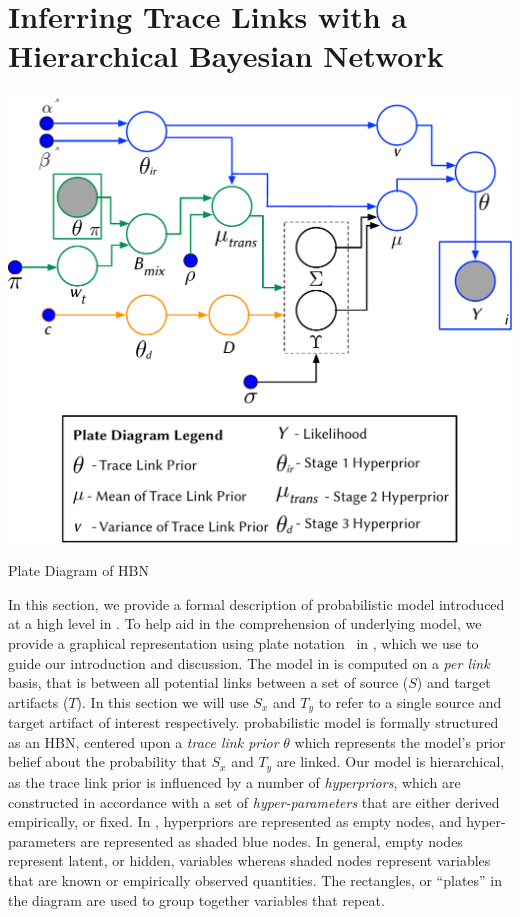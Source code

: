 \chapter{Inferring Trace Links with \hfill \break a Hierarchical Bayesian Network}
\label{ch:appI-approach-i}

\begin{marginfigure}%
\centering

\includegraphics[width=\columnwidth]{graphics/applicationsI-approach/fig1_Model-Plate-Diagram.pdf}

\caption{Plate Diagram of \Comets HBN}
\label{fig:model-approachI}
\end{marginfigure}

In this section, we provide a formal description of \Comets probabilistic model introduced at a high level in  . To help aid in the comprehension of \Comets underlying model, we provide a graphical representation using plate notation~\citep{Murphy:2012} in , which we use to guide our introduction and discussion. The model in  is computed on a \textit{per link} basis, that is between all potential links between a set of source ($S$) and target artifacts ($T$). In this section we will use $S_x$ and $T_y$ to refer to a single source and target artifact of interest respectively. \Comets probabilistic model is formally structured as an HBN, centered upon a \textit{trace link prior} $\theta$ which represents the model's prior belief about the probability that $S_x$ and $T_y$ are linked.  Our model is hierarchical, as the trace link prior is influenced by a number of \textit{hyperpriors}, which are constructed in accordance with a set of \textit{hyper-parameters} that are either derived empirically, or fixed. In , hyperpriors are represented as empty nodes, and hyper-parameters are represented as shaded blue nodes. In general, empty nodes represent latent, or hidden, variables whereas shaded nodes represent variables that are known or empirically observed quantities. The rectangles, or ``plates'' in the diagram are used to group together variables that repeat.

